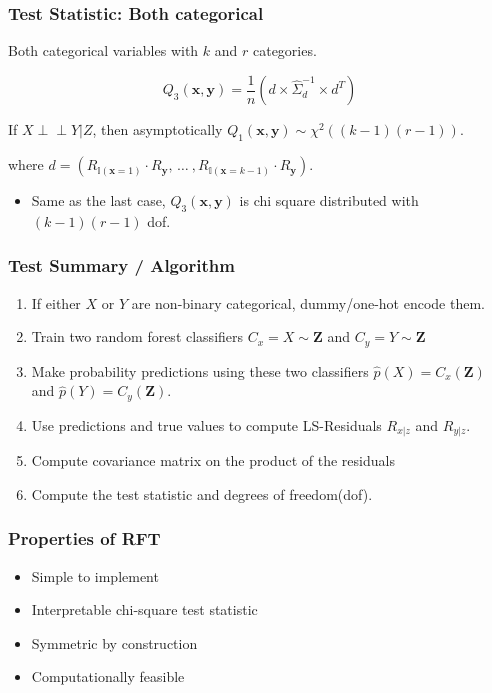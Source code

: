 \documentclass{beamer}
\def\ci{\perp\!\!\!\!\!\perp}
\begin{document}
\begin{frame}
	\frametitle{Test Statistic: Both categorical}
	Both categorical variables with $ k $ and $ r $ categories.


	$$ Q_3(\bm{x}, \bm{y}) = \frac{1}{n} (d \times \hat{\Sigma}_d^{-1} \times d^T) $$

	If $ X \ci Y | Z $, then asymptotically $ Q_1(\bm{x}, \bm{y}) \sim
	\chi^2((k-1)(r-1)) $.

	where $ d = (R_{\mathbb{I}(\mathbf{x}=1)} \cdot R_{\mathbf{y}}, \, \ldots \ ,
		R_{\mathbb{I}(\mathbf{x}=k-1)} \cdot R_{\mathbf{y}}) $.

	\begin{itemize}
		\setlength\itemsep{1em}
		\item Same as the last case, $ Q_3(\bm{x}, \bm{y}) $ is chi square distributed 
			with $ (k-1)(r-1) $ dof.
	\end{itemize}
\end{frame}

\begin{frame}
	\frametitle{Test Summary / Algorithm}
	\begin{enumerate}
		\setlength\itemsep{1em}
		\item If either $ X $ or $ Y $ are non-binary categorical,
			dummy/one-hot encode them.
		\item Train two random forest classifiers $ C_x = X \sim \bm{Z} $ and
			$ C_y = Y \sim \bm{Z} $
		\item Make probability predictions using these two classifiers
			$ \hat{p}(X) = C_x(\bm{Z}) $ and $ \hat{p}(Y) =
			C_y(\bm{Z}) $.
		\item Use predictions and true values to compute LS-Residuals $ R_{x|z} $ and $ R_{y|z} $.	
		\item Compute covariance matrix on the product of the residuals
		\item Compute the test statistic and degrees of freedom(dof).
	\end{enumerate}
\end{frame}

\begin{frame}
	\frametitle{Properties of RFT}
	\begin{itemize}
		\setlength\itemsep{1em}
		\item Simple to implement
		\item Interpretable chi-square test statistic
		\item Symmetric by construction
		\item Computationally feasible
	\end{itemize}
\end{frame}
\end{document}
